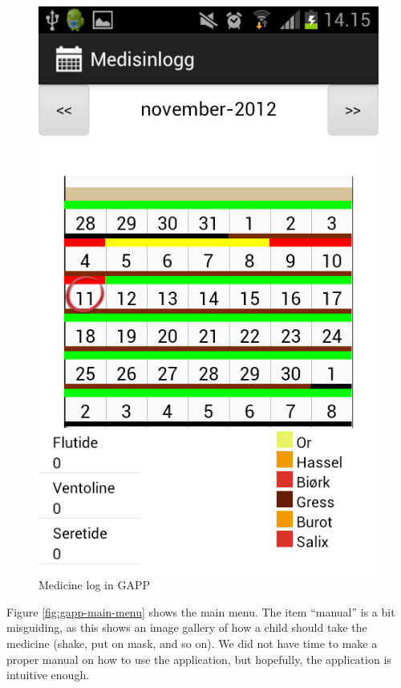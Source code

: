 \begin{figure}
	\begin{minipage}[b]{0.4\linewidth}
		\centering
		\includegraphics[width=0.20\paperwidth]{Pictures/Screenshots/logg.png}
	\caption{Medicine log in GAPP}
	\label{fig:gapp-log}
	\end{minipage}
\end{figure}




Figure \ref{fig:gapp-main-menu} shows the main menu. The item ``manual'' is a bit misguiding, as this shows an image gallery of 
how a child should take the medicine (shake, put on mask, and so on). We did not have time to make a proper manual on how to use the
application, but hopefully, the application is intuitive enough.


